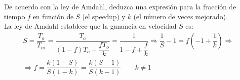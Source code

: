 \begin{ejercicio}
De acuerdo con la ley de Amdahl, deduzca una expresión para la fracción de tiempo $f$ en función de $S$ (el speedup) y $k$ (el número de veces mejorado).\\

La ley de Amdahl establece que la ganancia en velocidad $S$ es:
\begin{multline*}
    S = \dfrac{T_o}{T_m} = \dfrac{T_o}{(1-f)T_o + \dfrac{fT_o}{k}} = \dfrac{1}{1-f + \dfrac{f}{k}}
    \Longrightarrow \dfrac{1}{S}-1=f\left(-1+\dfrac{1}{k}\right)
    \Longrightarrow \\ \Longrightarrow
    f = \dfrac{k(1-S)}{S(1-k)} = \dfrac{k(S-1)}{S(k-1)}\qquad k\neq 1
\end{multline*}
\end{ejercicio}

